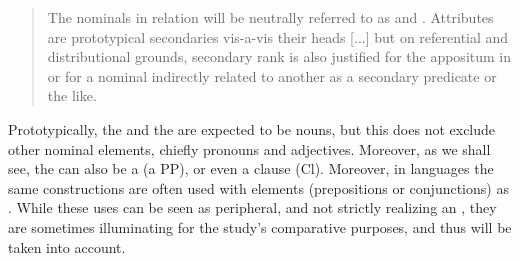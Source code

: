 \blockquote{The nominals in relation will be neutrally referred to as  and . Attributes are prototypical secondaries
vis-a-vis their heads [...] but on referential and distributional grounds, secondary rank is also justified for the appositum in  or for a nominal indirectly related to
another as a secondary predicate or the like.}

Prototypically, the \prim and the \secn are expected to be nouns, but this does not exclude other nominal elements, chiefly pronouns and adjectives. Moreover, as we shall see, the \secn can also be  a  (a PP), or even a clause (Cl). Moreover, in  languages the same constructions are often used with  elements (prepositions or conjunctions) as \prims. While these uses can be seen as peripheral, and not strictly realizing an , they are sometimes illuminating for the study's comparative purposes, and thus will be taken into account.



